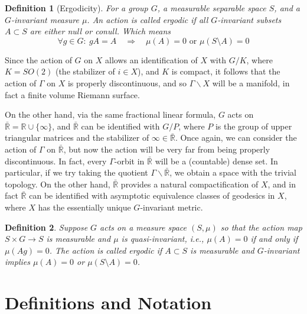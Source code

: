 \documentclass[
  12pt
]{article}
\newtheorem{defn}{Definition}[thm]
\theoremstyle{plain}
\begin{document}
  \begin{defn}[Ergodicity]
  For a group $G$, a measurable separable space $S$, and a $G$-invariant
  measure $\mu$. An action is called ergodic if all $G$-invariant subsets
  $A\subset S$ are either null or conull. Which means 
  $$
  \forall g\in G:\ gA = A \quad \Rightarrow \quad \mu(A)=0 \text{ or } \mu(S\setminus A)=0
  $$
  \end{defn}


  Since the action of $G$ on $X$
  allows an identification of $X$ with $G/K$, where $K = SO(2)$ (the
  stabilizer of $i \in X$), and $K$ is compact, it follows that the
  action of $\Gamma$ on $X$ is properly discontinuous, and so
  $\Gamma\backslash X$ will be a manifold, in fact a finite volume
  Riemann surface.

  On the other hand, via the same fractional linear
  formula, $G$ acts on
  $\bar{\mathbb{R}} = \mathbb{R} \cup \{ \infty \}$, and
  $\bar{\mathbb{R}}$ can be identified with $G/P$, where $P$ is the
  group of upper triangular matrices and the stabilizer of
  $\infty \in \bar{\mathbb{R}}$. Once again, we can consider the action
  of $\Gamma$ on $\bar{\mathbb{R}}$, but now the action will be very
  far from being properly discontinuous. In fact, every $\Gamma$-orbit
  in $\bar{\mathbb{R}}$ will be a (countable) dense set. In particular,
  if we try taking the quotient $\Gamma\backslash\bar{\mathbb{R}}$, we
  obtain a space with the trivial topology. On the other hand,
  $\bar{\mathbb{R}}$ provides a natural compactification of $X$, and
  in fact $\bar{\mathbb{R}}$ can be identified with asymptotic
  equivalence classes of geodesics in $X$, where $X$ has the
  essentially unique $G$-invariant metric.


  \begin{defn}
    Suppose $G$ acts on a measure space $(S, \mu)$ so that the action
    map $S \times G \rightarrow S$ is measurable and $\mu$ is
    quasi-invariant, i.e., $\mu(A) = 0$ if and only if $\mu(Ag) = 0$.
    The action is called ergodic if $A \subset S$ is measurable and
    $G$-invariant implies $\mu(A) = 0$ or $\mu(S\setminus A) = 0$.
  \end{defn}



\hypertarget{definitions-and-notation}{%
\section{Definitions and Notation}\label{definitions-and-notation}}
\end{document}
